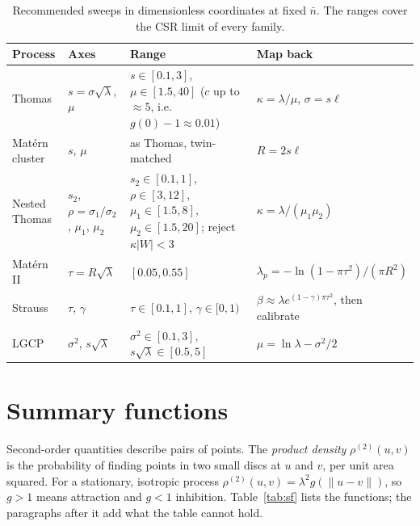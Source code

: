 \documentclass[10pt,a4paper]{article}
\newcommand{\nbar}{\bar n}
\begin{document}
\begin{table}[ht]
\centering\small
\begin{tabularx}{\linewidth}{@{}l l X l@{}}
\toprule
Process & Axes & Range & Map back\\
\midrule
Thomas & $s=\sigma\sqrt\lambda$, $\mu$ & $s\in[0.1,3]$, $\mu\in[1.5,40]$ ($c$ up to $\approx5$, i.e.\ $g(0)-1\approx0.01$) & $\kappa=\lambda/\mu$, $\sigma=s\ell$\\
Mat\'ern cluster & $s$, $\mu$ & as Thomas, twin-matched & $R=2s\ell$\\
Nested Thomas & $s_2$, $\rho=\sigma_1/\sigma_2$, $\mu_1$, $\mu_2$ & $s_2\in[0.1,1]$, $\rho\in[3,12]$, $\mu_1\in[1.5,8]$, $\mu_2\in[1.5,20]$; reject $\kappa|W|<3$ & $\kappa=\lambda/(\mu_1\mu_2)$\\
Mat\'ern II & $\tau=R\sqrt\lambda$ & $[0.05,0.55]$ & $\lambda_p=-\ln(1-\pi\tau^2)/(\pi R^2)$\\
Strauss & $\tau$, $\gamma$ & $\tau\in[0.1,1]$, $\gamma\in[0,1)$ & $\beta\approx\lambda e^{(1-\gamma)\pi\tau^2}$, then calibrate\\
LGCP & $\sigma^2$, $s\sqrt\lambda$ & $\sigma^2\in[0.1,3]$, $s\sqrt\lambda\in[0.5,5]$ & $\mu=\ln\lambda-\sigma^2/2$\\
\bottomrule
\end{tabularx}
\caption{Recommended sweeps in dimensionless coordinates at fixed $\nbar$. The ranges cover the CSR limit of every family.}
\label{tab:sweeps}
\end{table}

\section{Summary functions}\label{sec:sf}

Second-order quantities describe pairs of points. The \emph{product density} $\rho^{(2)}(u,v)$ is the probability of finding points in two small discs at $u$ and $v$, per unit area squared. For a stationary, isotropic process $\rho^{(2)}(u,v)=\lambda^2g(\|u-v\|)$, so $g>1$ means attraction and $g<1$ inhibition. Table~\ref{tab:sf} lists the functions; the paragraphs after it add what the table cannot hold.
\end{document}
